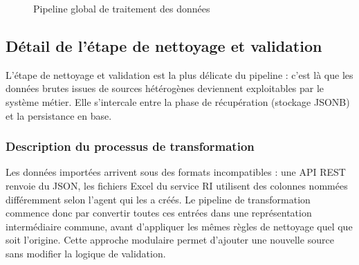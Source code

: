 \begin{figure}[H]
 \centering {}
\caption{Pipeline global de traitement des données}
\label{fig:pipeline-global}
\end{figure}

\subsection{Détail de l’étape de nettoyage et validation}

L’étape de nettoyage et validation est la plus délicate du pipeline : c’est là que les données brutes issues de sources hétérogènes deviennent exploitables par le système métier. Elle s’intercale entre la phase de récupération (stockage JSONB) et la persistance en base.
\subsubsection{Description du processus de transformation}

Les données importées arrivent sous des formats incompatibles : une API REST renvoie du JSON, les fichiers Excel du service RI utilisent des colonnes nommées différemment selon l’agent qui les a créés. Le pipeline de transformation commence donc par convertir toutes ces entrées dans une représentation intermédiaire commune, avant d’appliquer les mêmes règles de nettoyage quel que soit l’origine. Cette approche modulaire permet d’ajouter une nouvelle source sans modifier la logique de validation.

